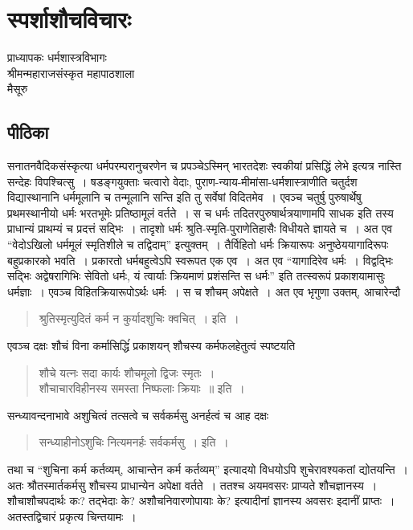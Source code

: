 {\fontsize{15}{17}\selectfont
\presetvalues
\chapter{स्पर्शाशौचविचारः}

\begin{center}
\smallskip
प्राध्यापकः धर्मशास्त्रविभागः\\
श्रीमन्महाराजसंस्कृत महापाठशाला\\ 
मैसूरु
\addrule
\end{center}

\section*{पीठिका}

सनातनवैदिकसंस्कृत्या धर्मपरम्परानुचरणेन च प्रपञ्चेऽस्मिन् भारतदेशः स्वकीयां प्रसिद्धिं लेभे इत्यत्र नास्ति सन्देहः विपश्चित्सु~। षडङ्गयुक्ताः चत्वारो वेदाः, पुराण-न्याय-मीमांसा-धर्मशास्त्राणीति चतुर्दश विद्यास्थानानि धर्ममूलानि च तन्मूलानि सन्ति इति तु सर्वेषां विदितमेव~। एवञ्च चतुर्षु पुरुषार्थेषु प्रथमस्थानीयो धर्मः भरतभूमेः प्रतिष्ठामूलं वर्तते~। स च धर्मः तदितरपुरुषार्थत्रयाणामपि साधक इति तस्य प्राधान्यं प्राथम्यं च प्रदत्तं सद्भिः~। तादृशो धर्मः श्रुति-स्मृति-पुराणेतिहासैः विधीयते ज्ञायते च~। अत एव “वेदोऽखिलो धर्ममूलं स्मृतिशीले च तद्विदाम्” इत्युक्तम्~। तैर्विहितो धर्मः क्रियारूपः अनुष्ठेययागादिरूपः बहुप्रकारको भवति~। प्रकारतो धर्मबहुत्वेऽपि स्वरूपत एक एव~। अत एव “यागादिरेव धर्मः~। विद्वद्भिः सद्भिः अद्वेषरागिभिः सेवितो धर्मः, यं त्वार्याः क्रियमाणं प्रशंसन्ति स धर्मः” इति तत्स्वरूपं प्रकाशयामासुः धर्मज्ञाः~। एवञ्च विहितक्रियारूपोऽर्थः धर्मः~। स च शौचम् अपेक्षते~। अत एव भृगुणा उक्तम्, आचारेन्दौ \enginline{-}
\begin{verse}
श्रुतिस्मृत्युदितं कर्म  न कुर्यादशुचिः क्वचित्~। इति~।
 \end{verse}
एवञ्च दक्षः शौचं विना कर्मासिद्धिंं प्रकाशयन् शौचस्य कर्मफलहेतुत्वं स्पष्टयति \enginline{-}
\begin{verse}
शौचे यत्नः सदा कार्यः शौचमूलो द्विजः स्मृतः~। \\
शौचाचारविहीनस्य समस्ता निष्फलाः क्रियाः~॥ इति~। 
\end{verse}
सन्ध्यावन्दनाभावे अशुचित्वं तत्सत्वे च सर्वकर्मसु अनर्हत्वं च आह दक्षः \enginline{-}
\begin{verse}
सन्ध्याहीनोऽशुचिः नित्यमनर्हः सर्वकर्मसु~। इति~। 
\end{verse}
तथा च “शुचिना कर्म कर्तव्यम्, आचान्तेन कर्म कर्तव्यम्” इत्यादयो विधयोऽपि शुचेरावश्यकतां द्योतयन्ति~। अतः श्रौतस्मार्तकर्मसु शौचस्य प्राधान्येन अपेक्षा वर्तते~। ततश्च अयमवसरः प्राप्यते शौचज्ञानस्य~। शौचाशौचपदार्थः कः? तद्भेदाः के? अशौचनिवारणोपायाः के? इत्यादीनां ज्ञानस्य अवसरः इदानीं प्राप्तः~। अतस्तद्विचारं प्रकृत्य चिन्तयामः~। 
~\\[-1cm]
}
